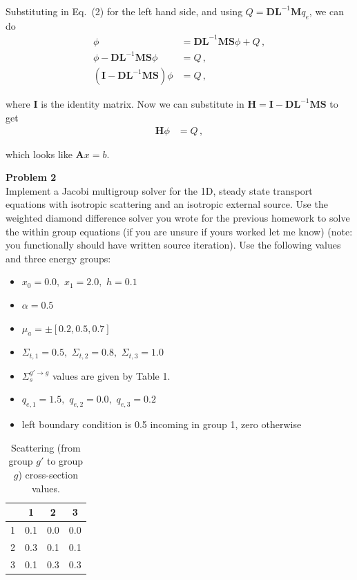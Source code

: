 \documentclass[10pt]{article}
\begin{document}
Substituting in Eq.~(2) for the left hand side, and using $Q=\textbf{D}\textbf{L} ^{-1}\textbf{M} q_e$, we can do
%
\begin{align*}
    \phi &= \textbf{D}\textbf{L} ^{-1}\textbf{MS} \phi + Q\,,\\
    \phi - \textbf{D}\textbf{L} ^{-1}\textbf{MS} \phi &= Q\,,\\
    (\textbf{I} - \textbf{D}\textbf{L} ^{-1}\textbf{MS})\phi &= Q\,,
\end{align*} 

where \textbf{I} is the identity matrix. Now we can substitute in  $\textbf{H} = \textbf{I} - \textbf{D}\textbf{L} ^{-1}\textbf{MS}$ to get 
%
\begin{align*}
    \textbf{H}\phi &= Q \,,
\end{align*} 

which looks like $\textbf{A}x = b$.





\newpage
\noindent \textbf{Problem 2}\\
Implement a Jacobi multigroup solver for the 1D, steady state transport equations with isotropic scattering and an isotropic external source. Use the weighted diamond difference solver you wrote for the previous homework to solve the within group equations (if you are unsure if yours worked let me know) (note: you functionally should have written source iteration). Use the following values and three energy groups:
%
\begin{itemize}
\setlength\itemsep{-3pt}
    \item $x_0=0.0,\,\,x_1=2.0,\,\,h=0.1$
    \item $\alpha=0.5$
    \item $\mu_a = \pm[0.2,0.5,0.7]$
    \item $\Sigma_{t,1}=0.5,\,\, \Sigma_{t,2}=0.8,\,\, \Sigma_{t,3}=1.0$
    \item $\Sigma_s^{g' \rightarrow g}$ values are given by Table 1.
    \item $q_{e,1}=1.5,\,\, q_{e,2}=0.0,\,\, q_{e,3}=0.2$
    \item left boundary condition is 0.5 incoming in group 1, zero otherwise
\end{itemize}
%
\begin{table}[htb!]
	\centering
	\setlength{\tabcolsep}{10pt}
	\begin{tabular}{|c|c|c|c|}
		\hline
		\diagbox[width=40pt, height=20pt]{$g$}{$g'$} & 1 & 2 & 3 \\ \hline
		1 & 0.1 & 0.0 & 0.0 \\ 
		2 & 0.3 & 0.1 & 0.1 \\ 
		3 & 0.1 & 0.3 & 0.3 \\ \hline
	\end{tabular}
	\caption{Scattering (from group $g'$ to group $g$) cross-section values.}
\end{table}
\end{document}
